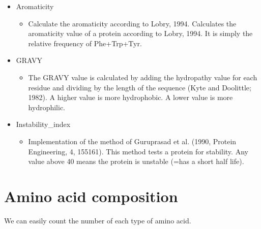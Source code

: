\documentclass[letterpaper,10pt,english]{jupyterBook}
\begin{document}
\begin{itemize}
\begin{itemize}
\end{itemize}

\item {} 
\sphinxAtStartPar
Aromaticity
\begin{itemize}
\item {} 
\sphinxAtStartPar
Calculate the aromaticity according to Lobry, 1994. Calculates the aromaticity value of a protein according to Lobry, 1994. It is simply the relative frequency of Phe+Trp+Tyr.

\end{itemize}

\item {} 
\sphinxAtStartPar
GRAVY
\begin{itemize}
\item {} 
\sphinxAtStartPar
The GRAVY value is calculated by adding the hydropathy value for each residue and dividing by the length of the sequence (Kyte and Doolittle; 1982). A higher value is more hydrophobic. A lower value is more hydrophilic.

\end{itemize}

\item {} 
\sphinxAtStartPar
Instability\_index
\begin{itemize}
\item {} 
\sphinxAtStartPar
Implementation of the method of Guruprasad et al. (1990, Protein Engineering, 4, 155\sphinxhyphen{}161). This method tests a protein for stability. Any value above 40 means the protein is unstable (=has a short half life).

\end{itemize}

\end{itemize}


\section{Amino acid composition}
\label{\detokenize{ipynb/chapter1:amino-acid-composition}}
\sphinxAtStartPar
We can easily count the number of each type of amino acid.
\end{document}
